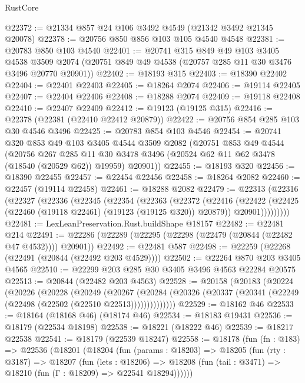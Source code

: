 \begin{lexlean}{RustCore}
\begin{coremodule}
@22372 := @21334 @857 @24 @106 @3492 @4549 (@21342 @3492 @21345 @20078)
@22378 := @20756 @850 @856 @103 @105 @4540 @4548
@22381 := @20783 @850 @103 @4540
@22401 := @20741
    @315
    @849
    @49
    @103
    @3405
    @4538
    @3509
    @2074
    (@20751 @849 @49 @4538 (@20757 @285 @11 @30 @3476 @3496 @20770 @20901))
@22402 := @18193 @315
@22403 := @18390 @22402
@22404 := @22401 @22403
@22405 := @18264 @2074
@22406 := @19114 @22405
@22407 := @22404 @22406
@22408 := @18288 @2074
@22409 := @19118 @22408
@22410 := @22407 @22409
@22412 := @19123 (@19125 @315)
@22416 := @22378 (@22381 (@22410 @22412 @20879))
@22422 := @20756 @854 @285 @103 @30 @4546 @3496
@22425 := @20783 @854 @103 @4546
@22454 := @20741
    @320
    @853
    @49
    @103
    @3405
    @4544
    @3509
    @2082
    (@20751
      @853
      @49
      @4544
      (@20756
        @267
        @285
        @11
        @30
        @3478
        @3496
        (@20524 @62 @11 @62 @3478 (@18540 (@20529 @62)) @19959)
        @20901))
@22455 := @18193 @320
@22456 := @18390 @22455
@22457 := @22454 @22456
@22458 := @18264 @2082
@22460 := @22457 (@19114 @22458)
@22461 := @18288 @2082
@22479 := @22313
    (@22316
      (@22327
        (@22336
          (@22345
            (@22354
              (@22363
                (@22372
                  (@22416
                    (@22422
                      (@22425 (@22460 (@19118 @22461) (@19123 (@19125 @320)) @20879))
                      @20901)))))))))
@22481 := LexLeanPreservation.Rust.buildShape @18157
@22482 := @22481 @214
@22491 := @22286 (@22289 (@22295 (@22298 (@22479 (@20844 (@22482 @47 @4532)))) @20901))
@22492 := @22481 @587
@22498 := @22259 (@22268 (@22491 (@20844 (@22492 @203 @4529))))
@22502 := @22264 @870 @203 @3405 @4565
@22510 := @22299 @203 @285 @30 @3405 @3496 @4563 @22284 @20575
@22513 := @20844 (@22482 @203 @4563)
@22528 := @20158
    (@20183
      (@20224
        (@20226
          (@20228
            (@20249
              (@20267
                (@20284 (@20326 (@20337 (@20341 (@22249 (@22498 (@22502 (@22510 @22513))))))))))))))
@22529 := @18162 @46
@22533 := @18164 (@18168 @46) (@18174 @46)
@22534 := @18183 @19431
@22536 := @18179 (@22534 @18198)
@22538 := @18221 (@18222 @46)
@22539 := @18217 @22538
@22541 := @18179 (@22539 @18247)
@22558 := @18178
    (fun (fn : @183) =>
    @22536
      (@18201
        (@18204
          (fun (params : @18203) =>
          @18205
            (fun (rty : @3187) =>
            @18207
              (fun (lets : @18206) =>
              @18208 (fun (tail : @3471) => @18210 (fun (Γ : @18209) => @22541 @18294))))))

\end{coremodule}
\end{lexlean}
